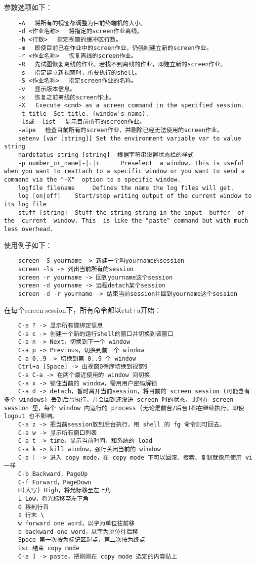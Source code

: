 \documentclass[a4paper,left=2.5cm,right=2.5cm,11pt]{article}
\begin{document}
	参数选项如下：
	\begin{lstlisting}
	-A 　将所有的视窗都调整为目前终端机的大小。 
	-d <作业名称> 　将指定的screen作业离线。 
	-h <行数> 　指定视窗的缓冲区行数。 
	-m 　即使目前已在作业中的screen作业，仍强制建立新的screen作业。 
	-r <作业名称> 　恢复离线的screen作业。 
	-R 　先试图恢复离线的作业。若找不到离线的作业，即建立新的screen作业。 
	-s 　指定建立新视窗时，所要执行的shell。 
	-S <作业名称> 　指定screen作业的名称。 
	-v 　显示版本信息。 
	-x 　恢复之前离线的screen作业。 
	-X   Execute <cmd> as a screen command in the specified session.
	-t title  Set title. (window's name).
	-ls或--list 　显示目前所有的screen作业。 
	-wipe 　检查目前所有的screen作业，并删除已经无法使用的screen作业。
	setenv [var [string]] Set the environment variable var to value string
	hardstatus string [string] 	根据字符串设置状态栏的样式
	-p number_or_name|-|=|+		 Preselect  a window. This is useful when you want to reattach to a specific window or you want to send a command via the "-X"  option to a specific window.
	logfile filename	 Defines the name the log files will get.
	log [on|off]	Start/stop writing output of the current window to its log file
	stuff [string]	Stuff the string string in the input  buffer  of  the  current  window. This  is like the "paste" command but with much less overhead.
	\end{lstlisting}

	使用例子如下：
	\begin{lstlisting}
	screen -S yourname -> 新建一个叫yourname的session 
	screen -ls -> 列出当前所有的session 
	screen -r yourname -> 回到yourname这个session 
	screen -d yourname -> 远程detach某个session 
	screen -d -r yourname -> 结束当前session并回到yourname这个session
	\end{lstlisting}

	在每个screen session下，所有命令都以ctrl+a开始：
	\begin{lstlisting}
	C-a ? -> 显示所有键绑定信息 
	C-a c -> 创建一个新的运行shell的窗口并切换到该窗口 
	C-a n -> Next，切换到下一个 window 
	C-a p -> Previous，切换到前一个 window 
	C-a 0..9 -> 切换到第 0..9 个 window 
	Ctrl+a [Space] -> 由视窗0循序切换到视窗9 
	C-a C-a -> 在两个最近使用的 window 间切换 
	C-a x -> 锁住当前的 window，需用用户密码解锁 
	C-a d -> detach，暂时离开当前session，将目前的 screen session (可能含有多个 windows) 丢到后台执行，并会回到还没进 screen 时的状态，此时在 screen session 里，每个 window 内运行的 process (无论是前台/后台)都在继续执行，即使 logout 也不影响。 
	C-a z -> 把当前session放到后台执行，用 shell 的 fg 命令则可回去。 
	C-a w -> 显示所有窗口列表 
	C-a t -> time，显示当前时间，和系统的 load 
	C-a k -> kill window，强行关闭当前的 window 
	C-a [ -> 进入 copy mode，在 copy mode 下可以回滚、搜索、复制就像用使用 vi 一样 
	C-b Backward，PageUp 
	C-f Forward，PageDown 
	H(大写) High，将光标移至左上角 
	L Low，将光标移至左下角 
	0 移到行首 
	$ 行末 \
	w forward one word，以字为单位往前移 
	b backward one word，以字为单位往后移 
	Space 第一次按为标记区起点，第二次按为终点 
	Esc 结束 copy mode 
	C-a ] -> paste，把刚刚在 copy mode 选定的内容贴上
	\end{lstlisting}
\end{document}
